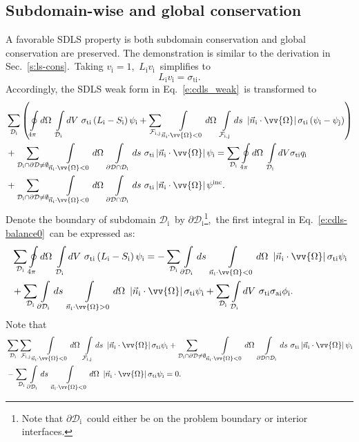 \documentclass[review]{elsarticle}
\newcommand{\sti}{\sigma_\mm{ti}}
\newcommand{\nno}{\nonumber}
\newcommand{\psii}[1]{\psi^\mathrm{inc}_\mathrm{{#1}}}
\newcommand{\mm}[1]{\mathrm{#1}}
\newcommand{\pd}{{\partial\mathcal{D}}}
\newcommand{\intli}[1]{\int\limits_{{#1}}}
\newcommand{\ointli}[1]{\oint\limits_{{#1}}}
\newcommand{\dii}{{\mathcal{D}_\mathrm{i}}}
\newcommand{\fij}{{\mathcal{F}_\mathrm{i,j}}}
\newcommand{\pdi}{{\partial\mathcal{D}_\mathrm{i}}}
\newcommand{\slim}[1]{\sum\limits_{\tiny#1}}
\newcommand{\nido}{\vec{n}_\mathrm{i}\cdot\ome}
\newcommand{\absnido}{\left|\nido\right|}
\newcommand{\ome}{\vv{\Omega}}
\newcommand{\dome}{d\Omega}
\begin{document}
\subsection{Subdomain-wise and global conservation}
{A favorable SDLS property is both subdomain conservation and global conservation are preserved. The demonstration is similar to the derivation in Sec.\ \ref{s:ls-cons}.\ Taking $v_\mm{i}=1$,\ $L_\mm{i}v_\mm{i}$\ simplifies to
\begin{equation}\label{e:test}
L_\mm{i}v_\mm{i}=\sti.
\end{equation}
Accordingly, the SDLS weak form in Eq.\ \eqref{e:cdls_weak}\ is transformed to
\begin{align}\label{e:cdls-balance0}
&\slim{\dii}\left(\ointli{4\pi}d\Omega\ \intli{\dii}dV\ \sti\left(L_\mathrm{i}-S_\mathrm{i}\right)\psi_\mathrm{i}+\slim{\fij}\intli{\nido<0}d\Omega\ \intli{\fij}ds\  \absnido\sti\left(\psi_\mathrm{i}-\psi_\mathrm{j}\right)\right)\nno\\
&+{\slim{\dii\cap\pd\neq\emptyset}\intli{\nido<0}d\Omega\ \intli{\pd\cap\dii}ds\ \sigma_\mm{ti}\absnido\psi_\mm{i}}=\slim{\dii}\ointli{4\pi}d\Omega\ \intli{\dii}dV \sti q_\mathrm{i}\\
&+{\slim{\dii\cap\pd\neq\emptyset}\intli{\nido<0}d\Omega\ \intli{\pd\cap\dii}ds\ \sigma_\mm{ti}\absnido\psii{}.}\nno
\end{align}
Denote the boundary of subdomain $\dii$\ by $\pdi$\footnote{{Note that $\partial\dii$\ could either be on the problem boundary or interior interfaces.}},\ the first integral in Eq.\ \eqref{e:cdls-balance0}\ can be expressed as:
\begin{align}\label{e:cdls-part}
&\slim{\dii}\ointli{4\pi}d\Omega\ \intli{\dii}dV\ \sti\left(L_\mathrm{i}-S_\mathrm{i}\right)\psi_\mathrm{i}=-\slim{\dii}\intli{\pdi}ds\ \intli{\nido<0}\dome\ \absnido\sti\psi_\mm{i}\nno\\
&+\slim{\dii}\intli{\pdi}ds\ \intli{\nido>0}\dome\ \absnido\sti\psi_\mm{i}+\slim{\dii}\intli{\dii}dV\ \sti\sigma_\mm{ai}\phi_\mm{i}.
\end{align}
Note that
\begin{align}\label{e:note}
&\slim{\dii}\slim{\fij}\intli{\nido<0}d\Omega\ \intli{\fij}ds\  \absnido\sti\psi_\mathrm{i}+{\slim{\dii\cap\pd\neq\emptyset}\intli{\nido<0}d\Omega\ \intli{\pd\cap\dii}ds\ \sigma_\mm{ti}\absnido\psi_\mm{i}}\nno\\
&-\slim{\dii}\intli{\pdi}ds\ \intli{\nido<0}\dome\ \absnido\sti\psi_\mm{i}=0.

\end{align}}
\end{document}
